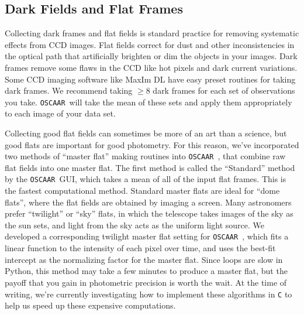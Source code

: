 \documentclass[a4paper]{article}
\newcommand{\code}[1]{\texttt{#1}}
\newcommand{\oscaar}{\code{OSCAAR}~}
\begin{document}
\subsection{Dark Fields and Flat Frames}

Collecting dark frames and flat fields is standard practice for removing systematic effects from CCD images. Flat fields correct for dust and other inconsistencies in the optical path that artificially brighten or dim the objects in your images. Dark frames remove some flaws in the CCD like hot pixels and dark current variations. Some CCD imaging software like MaxIm DL have easy preset routines for taking dark frames.  We recommend taking $\ge8$ dark frames for each set of observations you take. \oscaar will take the mean of these sets and apply them appropriately to each image of your data set. 

Collecting good flat fields can sometimes be more of an art than a science, but good flats are important for good photometry. For this reason, we've incorporated two methods of ``master flat'' making routines into \oscaar, that combine raw flat fields into one master flat. The first method is called the ``Standard'' method by the \oscaar GUI, which takes a mean of all of the input flat frames. This is the fastest computational method. Standard master flats are ideal for ``dome flats'', where the flat fields are obtained by imaging a screen. Many astronomers prefer ``twilight'' or ``sky'' flats, in which the telescope takes images of the sky as the sun sets, and light from the sky acts as the uniform light source. We developed a corresponding twilight master flat setting for \oscaar, which fits a linear function to the intensity of each pixel over time, and uses the best-fit intercept as the normalizing factor for the master flat. Since loops are slow in Python, this method may take a few minutes to produce a master flat, but the payoff that you gain in photometric precision is worth the wait. At the time of writing, we're currently investigating how to implement these algorithms in \code{C} to help us speed up these expensive computations.

\end{document}
